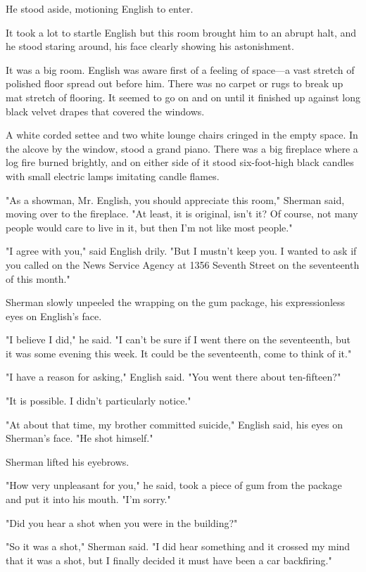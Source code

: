 \documentclass{novel}
\begin{document}
He stood aside, motioning English to enter.

It took a lot to startle English but this room brought him to an abrupt halt, and he stood staring around, his face clearly showing his astonishment.

It was a big room. English was aware first of a feeling of space—a vast stretch of polished floor spread out before him. There was no carpet or rugs to break up mat stretch of flooring. It seemed to go on and on until it finished up against long black velvet drapes that covered the windows.

A white corded settee and two white lounge chairs cringed in the empty space. In the alcove by the window, stood a grand piano. There was a big fireplace where a log fire burned brightly, and on either side of it stood six-foot-high black candles with small electric lamps imitating candle flames.

"As a showman, Mr. English, you should appreciate this room," Sherman said, moving over to the fireplace. "At least, it is original, isn't it? Of course, not many people would care to live in it, but then I'm not like most people."

"I agree with you," said English drily. "But I mustn't keep you. I wanted to ask if you called on the News Service Agency at 1356 Seventh Street on the seventeenth of this month."

Sherman slowly unpeeled the wrapping on the gum package, his expressionless eyes on English's face.

"I believe I did," he said. "I can't be sure if I went there on the seventeenth, but it was some evening this week. It could be the seventeenth, come to think of it."

"I have a reason for asking," English said. "You went there about ten-fifteen?"

"It is possible. I didn't particularly notice."

"At about that time, my brother committed suicide," English said, his eyes on Sherman's face. "He shot himself."

Sherman lifted his eyebrows.

"How very unpleasant for you," he said, took a piece of gum from the package and put it into his mouth. "I'm sorry."

"Did you hear a shot when you were in the building?"

"So it was a shot," Sherman said. "I did hear something and it crossed my mind that it was a shot, but I finally decided it must have been a car backfiring."
\end{document}
